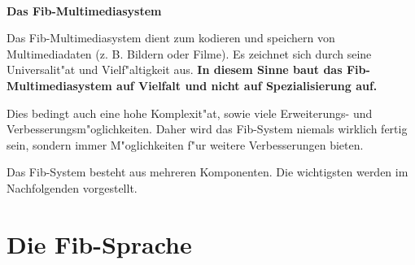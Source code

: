 \documentclass[10pt,a4paper]{article}
\begin{document}





\ \vspace{-2.5cm}
\begin{center}
	\LARGE\bf Das Fib-Multimediasystem\\
\end{center}

\bigskip\noindent
Das Fib-Multimediasystem dient zum kodieren und speichern von Multimediadaten (z. B. Bildern oder Filme). Es zeichnet sich durch seine Universalit"at und Vielf"altigkeit aus.
\textbf{In diesem Sinne baut das Fib-Multimediasystem auf Vielfalt und nicht auf Spezialisierung auf.}

Dies bedingt auch eine hohe Komplexit"at, sowie viele Erweiterungs- und Verbesserungsm"oglichkeiten. Daher wird das Fib-System niemals wirklich fertig sein, sondern immer M"oglichkeiten f"ur weitere Verbesserungen bieten.



Das Fib-System besteht aus mehreren Komponenten. Die wichtigsten werden im Nachfolgenden vorgestellt.

\section{Die Fib-Sprache}
\end{document}
